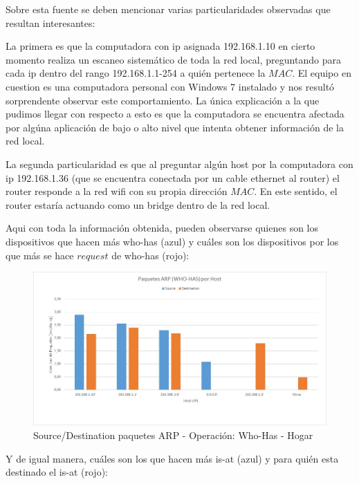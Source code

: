 Sobre esta fuente se deben mencionar varias particularidades observadas que resultan interesantes:

La primera es que la computadora con ip asignada 192.168.1.10 en cierto momento realiza un escaneo sistemático de toda la red local, preguntando para cada ip dentro del rango 192.168.1.1-254 a quién pertenece la $MAC$. El equipo en cuestion es una computadora personal con Windows 7 instalado y nos resultó sorprendente observar este comportamiento. La única explicación a la que pudimos llegar con respecto a esto es que la computadora se encuentra afectada por algúna aplicación de bajo o alto nivel 
que intenta obtener información de la red local.

La segunda particularidad es que al preguntar algún host por la computadora con ip 192.168.1.36 (que se encuentra conectada por un cable ethernet al router) el router responde a la red wifi con su propia dirección $MAC$. En este sentido, el router estaría actuando como un bridge dentro de la red local.

Aqui con toda la información obtenida, pueden observarse quienes son los dispositivos que hacen más who-has (azul) y cuáles son los dispositivos por los que más se hace $request$ de who-has (rojo):

\newpage

\begin{figure}[h!]
\centering
\includegraphics[scale=0.5]{./img/arp_whoHas_casa.jpg}
\caption{Source/Destination paquetes ARP - Operación: Who-Has - Hogar}
\end{figure}

Y de igual manera, cuáles son los que hacen más is-at (azul) y para quién esta destinado el is-at (rojo):

